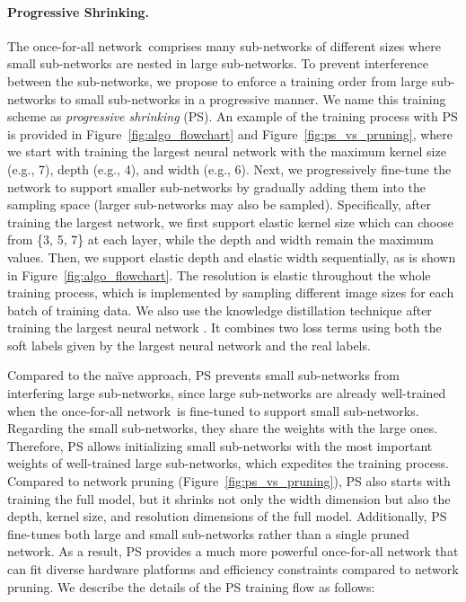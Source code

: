 \documentclass{article} \usepackage{iclr2020_conference,times}
\newcommand{\myparagraph}[1]{\vspace{-3pt}\paragraph{#1}}
\newcommand{\motherNet}{once-for-all network}
\begin{document}
\myparagraph{Progressive Shrinking.} The \motherNet~comprises many sub-networks of different sizes where small sub-networks are nested in large sub-networks. 
To prevent interference between the sub-networks, we propose to enforce a training order from large sub-networks to small sub-networks in a progressive manner. We name this training scheme as \emph{progressive shrinking} (PS). An example of the training process with PS is provided in Figure~\ref{fig:algo_flowchart} and Figure~\ref{fig:ps_vs_pruning}, where we start with training the largest neural network with the maximum kernel size (e.g., 7), depth (e.g., 4), and width (e.g., 6). Next, we progressively fine-tune the network to support smaller sub-networks by gradually adding them into the sampling space (larger sub-networks may also be sampled). Specifically, after training the largest network, we first support elastic kernel size which can choose from \{3, 5, 7\} at each layer, while the depth and width remain the maximum values. Then, we support elastic depth and elastic width sequentially, as is shown in Figure~\ref{fig:algo_flowchart}. The resolution is elastic throughout the whole training process, which is implemented by sampling different image sizes for each batch of training data. We also use the knowledge distillation technique after training the largest neural network \citep{hinton2015distilling,ashok2017n2n,yu2019universally}. It combines two loss terms using both the soft labels given by the largest neural network and the real labels.

Compared to the na\"{i}ve approach, PS prevents small sub-networks from interfering large sub-networks, since large sub-networks are already well-trained when the \motherNet~is fine-tuned to support small sub-networks.  Regarding the small sub-networks, they share the weights with the large ones. Therefore, PS allows initializing small sub-networks with the most important weights of well-trained large sub-networks, which expedites the training process. Compared to network pruning (Figure~\ref{fig:ps_vs_pruning}), PS also starts with training the full model, but it shrinks not only the width dimension but also the depth, kernel size, and resolution dimensions of the full model. Additionally, PS fine-tunes both large and small sub-networks rather than a single pruned network. As a result, PS provides a much more powerful once-for-all network that can fit diverse hardware platforms and efficiency constraints compared to network pruning. 
We describe the details of the PS training flow as follows:
\end{document}
